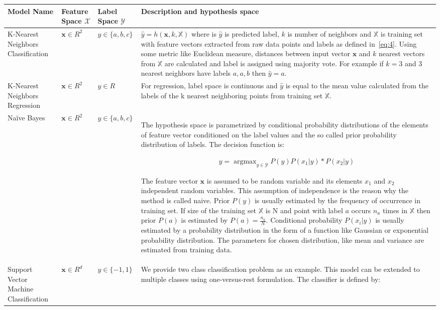 \documentclass[english, 12pt, a4paper, elec, utf8, online]{aaltothesis}
\DeclareMathOperator*{\argmax}{argmax} %
\begin{document}
\begin{longtable}{ |p{3cm}|p{1.5cm}|p{2.2cm}|p{9cm}| } 
\hline
\textbf{Model Name} & \textbf{Feature Space} $\mathcal{X}$ & \textbf{Label Space} $\mathcal{Y}$  & \textbf{Description and hypothesis space} \\
\hline
K-Nearest Neighbors \newline Classification 
& $\mathbf{x} \in R^2$ 
& $y \in \{a, b, c\}$ 
& $\hat{y} = h(\mathbf{x}, k, \mathbb{X})$ where is $\hat{y}$ is predicted label, $k$ is number of neighbors and $\mathbb{X}$ is training set with feature vectors extracted from raw data points and labels as defined in~\ref{eq:4}. Using some metric like Euclidean measure, distances between input vector $\mathbf{x}$ and $k$ nearest vectors from $\mathbb{X}$ are calculated and label is assigned using majority vote. For example if $k=3$ and 3 nearest neighbors have labels $a,a,b$ then $\hat{y}=a$.      
\\ 
\hline 
K-Nearest Neighbors \newline Regression 
& $\mathbf{x} \in R^2$ 
& $y \in R$ 
& For regression, label space is continuous and $\hat{y}$ is equal to the mean value calculated from the labels of the k nearest neighboring points from training set $\mathbb{X}$. 
\\
\hline
Naïve Bayes 
& $\mathbf{x} \in R^2$  
& $y \in \{a, b, c\}$ 
& The hypothesis space is parametrized by conditional probability distributions of the elements of feature vector conditioned on the label values and the so called prior probability distribution of labels. The decision function is:

\begin{align*}
\hat{y} = \argmax_{y \in \mathcal{Y}} P(y)P(x_1|y)*P(x_2|y) 
\end{align*}  

The feature vector $\mathbf{x}$ is assumed to be random variable and its elements $x_{1}$ and $x_{2}$ independent random variables. This assumption of independence is the reason why the method is called naive. Prior $P(y)$ is usually estimated by the frequency of occurrence in training set. If size of the training set $\mathbb{X}$ is N and point with label $a$ occurs $n_a$ times in $\mathbb{X}$ then prior $P(a)$ is estimated by $P(a)=\frac{n_a}{N}$. Conditional probability $P(x_i|y)$ is usually estimated by  a probability distribution in the form of a function like Gaussian or exponential probability distribution. The parameters for chosen distribution, like mean and variance are estimated from training data.      
\\ 
\hline 
Support Vector Machine \newline Classification 
& $\mathbf{x} \in R^d$  
& $y \in \{-1, 1\}$
& We provide two class classification problem as an example. This model can be extended to multiple classes using one-versus-rest formulation. The classifier is defined by:


\end{longtable}
\end{document}
